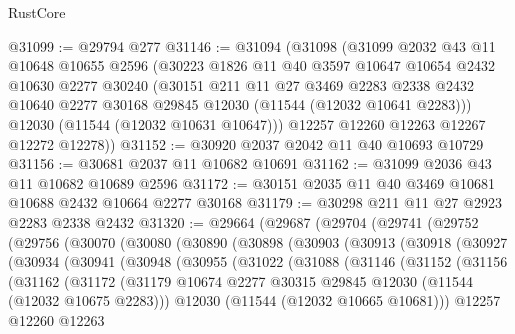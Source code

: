 \begin{lexlean}{RustCore}
\begin{coremodule}
@31099 := @29794 @277
@31146 := @31094
    (@31098
      (@31099
        @2032
        @43
        @11
        @10648
        @10655
        @2596
        (@30223
          @1826
          @11
          @40
          @3597
          @10647
          @10654
          @2432
          @10630
          @2277
          @30240
          (@30151
            @211
            @11
            @27
            @3469
            @2283
            @2338
            @2432
            @10640
            @2277
            @30168
            @29845
            @12030
            (@11544 (@12032 @10641 @2283)))
          @12030
          (@11544 (@12032 @10631 @10647)))
        @12257
        @12260
        @12263
        @12267
        @12272
        @12278))
@31152 := @30920 @2037 @2042 @11 @40 @10693 @10729
@31156 := @30681 @2037 @11 @10682 @10691
@31162 := @31099 @2036 @43 @11 @10682 @10689 @2596
@31172 := @30151 @2035 @11 @40 @3469 @10681 @10688 @2432 @10664 @2277 @30168
@31179 := @30298 @211 @11 @27 @2923 @2283 @2338 @2432
@31320 := @29664
    (@29687
      (@29704
        (@29741
          (@29752
            (@29756
              (@30070
                (@30080
                  (@30890
                    (@30898
                      (@30903
                        (@30913
                          (@30918
                            (@30927
                              (@30934
                                (@30941
                                  (@30948
                                    (@30955
                                      (@31022
                                        (@31088
                                          (@31146
                                            (@31152
                                              (@31156
                                                (@31162
                                                  (@31172
                                                    (@31179
                                                      @10674
                                                      @2277
                                                      @30315
                                                      @29845
                                                      @12030
                                                      (@11544 (@12032 @10675 @2283)))
                                                    @12030
                                                    (@11544 (@12032 @10665 @10681)))
                                                  @12257
                                                  @12260
                                                  @12263

\end{coremodule}
\end{lexlean}
